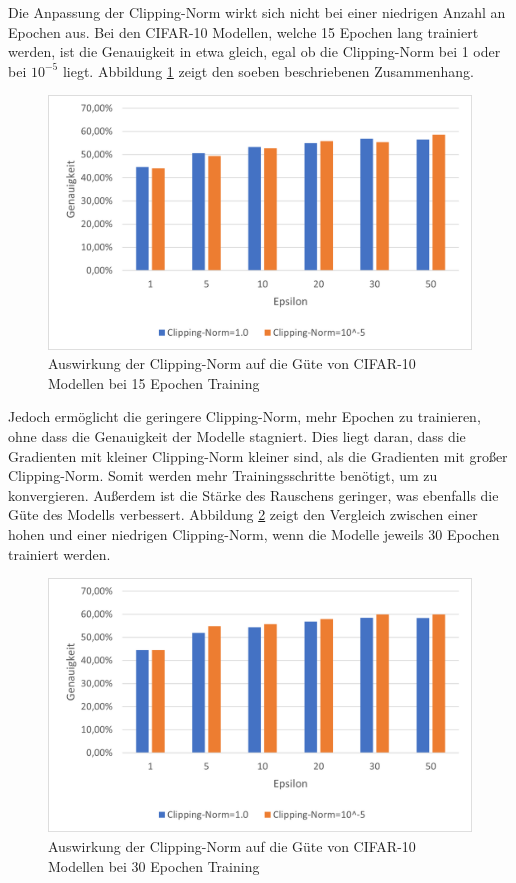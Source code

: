 Die Anpassung der Clipping-Norm wirkt sich nicht bei einer niedrigen Anzahl an Epochen aus.
Bei den CIFAR-10 Modellen, welche 15 Epochen lang trainiert werden, ist die Genauigkeit in etwa gleich, egal ob die Clipping-Norm bei 1 oder bei $10^{-5}$ liegt. 
Abbildung \ref{fig:cifar_clip1} zeigt den soeben beschriebenen Zusammenhang.
\begin{figure}[!htb]
    \centering
    \includegraphics[width=14cm]{figures/results_cifar/cifar_clipp1.png}
    \caption{Auswirkung der Clipping-Norm auf die Güte von CIFAR-10 Modellen bei 15 Epochen Training}
    \label{fig:cifar_clip1}
\end{figure} 

Jedoch ermöglicht die geringere Clipping-Norm, mehr Epochen zu trainieren, ohne dass die Genauigkeit der Modelle stagniert. 
Dies liegt daran, dass die Gradienten mit kleiner Clipping-Norm kleiner sind, als die Gradienten mit großer Clipping-Norm. 
Somit werden mehr Trainingsschritte benötigt, um zu konvergieren. 
Außerdem ist die Stärke des Rauschens geringer, was ebenfalls die Güte des Modells verbessert.
Abbildung \ref{fig:cifar_clip2} zeigt den Vergleich zwischen einer hohen und einer niedrigen Clipping-Norm, wenn die Modelle jeweils 30 Epochen trainiert werden.

\begin{figure}[!htb]
    \centering
    \includegraphics[width=14cm]{figures/results_cifar/cifar_clipp2.png}
    \caption{Auswirkung der Clipping-Norm auf die Güte von CIFAR-10 Modellen bei 30 Epochen Training}
    \label{fig:cifar_clip2}
\end{figure} 


